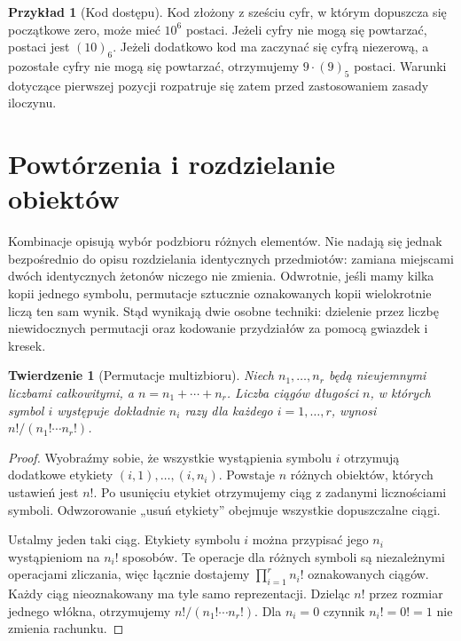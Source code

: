 \documentclass[11pt,a4paper,oneside]{report}
\numberwithin{equation}{chapter}
\theoremstyle{plain}
\newtheorem{twierdzenie}{Twierdzenie}[chapter]
\theoremstyle{definition}
\newtheorem{przyklad}{Przykład}[chapter]
\theoremstyle{remark}
\begin{document}
\begin{przyklad}[Kod dostępu]
Kod złożony z sześciu cyfr, w którym dopuszcza się początkowe zero,
może mieć $10^6$ postaci. Jeżeli cyfry nie mogą się powtarzać,
postaci jest $(10)_6$. Jeżeli dodatkowo kod ma zaczynać się cyfrą niezerową,
a pozostałe cyfry nie mogą się powtarzać, otrzymujemy
$9\cdot(9)_5$ postaci. Warunki dotyczące pierwszej pozycji rozpatruje się
zatem przed zastosowaniem zasady iloczynu.
\end{przyklad}

\section{Powtórzenia i rozdzielanie obiektów}
Kombinacje opisują wybór podzbioru różnych elementów. Nie nadają
się jednak bezpośrednio do opisu rozdzielania identycznych przedmiotów:
zamiana miejscami dwóch identycznych żetonów niczego nie zmienia.
Odwrotnie, jeśli mamy kilka kopii jednego symbolu, permutacje
sztucznie oznakowanych kopii wielokrotnie liczą ten sam wynik.
Stąd wynikają dwie osobne techniki: dzielenie przez liczbę
niewidocznych permutacji oraz kodowanie przydziałów
za pomocą gwiazdek i kresek.

\begin{twierdzenie}[Permutacje multizbioru]
Niech $n_1,\ldots,n_r$ będą nieujemnymi liczbami całkowitymi, a
$n=n_1+\cdots+n_r$. Liczba ciągów długości $n$, w których symbol $i$
występuje dokładnie $n_i$ razy dla każdego $i=1,\ldots,r$, wynosi
$n!/(n_1!\cdots n_r!)$.
\end{twierdzenie}
\begin{proof}
Wyobraźmy sobie, że wszystkie wystąpienia symbolu $i$
otrzymują dodatkowe etykiety $(i,1),\ldots,(i,n_i)$.
Powstaje $n$ różnych obiektów, których ustawień jest $n!$.
Po usunięciu etykiet otrzymujemy ciąg z zadanymi
licznościami symboli. Odwzorowanie „usuń etykiety”
obejmuje wszystkie dopuszczalne ciągi.

Ustalmy jeden taki ciąg. Etykiety symbolu $i$
można przypisać jego $n_i$ wystąpieniom na $n_i!$
sposobów. Te operacje dla różnych symboli są niezależnymi
operacjami zliczania, więc łącznie dostajemy
$\prod_{i=1}^r n_i!$ oznakowanych ciągów.
Każdy ciąg nieoznakowany ma tyle samo reprezentacji.
Dzieląc $n!$ przez rozmiar jednego włókna, otrzymujemy
$n!/(n_1!\cdots n_r!)$.
Dla $n_i=0$ czynnik $n_i!=0!=1$ nie zmienia rachunku.
\end{proof}
\end{document}
